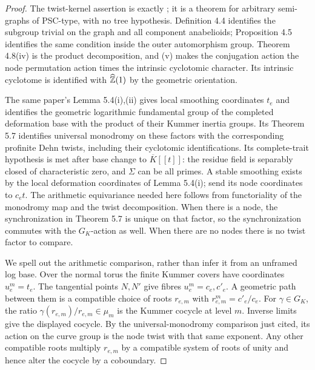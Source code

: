 \begin{proof}
The twist-kernel assertion is exactly \cite[Definition 4.4, Proposition 4.5, Theorem 4.8(iv),(v), and Proposition 4.10(ii), summarized as Theorem B]{HoshiMochizuki2012A567}; it is a theorem for arbitrary semi-graphs of PSC-type, with no tree hypothesis. Definition 4.4 identifies the subgroup trivial on the graph and all component anabelioids; Proposition 4.5 identifies the same condition inside the outer automorphism group. Theorem 4.8(iv) is the product decomposition, and (v) makes the conjugation action the node permutation action times the intrinsic cyclotomic character. Its intrinsic cyclotome is identified with $\widehat{{\mathbb{Z}}}(1)$ by the geometric orientation.

The same paper's Lemma 5.4(i),(ii) gives local smoothing coordinates $t_e$ and identifies the geometric logarithmic fundamental group of the completed deformation base with the product of their Kummer inertia groups. Its Theorem 5.7 identifies universal monodromy on these factors with the corresponding profinite Dehn twists, including their cyclotomic identifications. Its complete-trait hypothesis is met after base change to $\overline{K}[[t]]$: the residue field is separably closed of characteristic zero, and $\Sigma$ can be all primes. A stable smoothing exists by the local deformation coordinates of Lemma 5.4(i); send its node coordinates to $c_et$. The arithmetic equivariance needed here follows from functoriality of the monodromy map and the twist decomposition. When there is a node, the synchronization in Theorem 5.7 is unique on that factor, so the synchronization commutes with the $G_K$-action as well. When there are no nodes there is no twist factor to compare.

We spell out the arithmetic comparison, rather than infer it from an unframed log base. Over the normal torus the finite Kummer covers have coordinates $u_e^m=t_e$. The tangential points $N,N'$ give fibres $u_e^m=c_e,c'_e$. A geometric path between them is a compatible choice of roots $r_{e,m}$ with
$r_{e,m}^m=c'_e/c_e$. For $\gamma\in G_K$, the ratio
$\gamma(r_{e,m})/r_{e,m}\in\mu_m$ is the Kummer cocycle at level $m$. Inverse limits give the displayed cocycle. By the universal-monodromy comparison just cited, its action on the curve group is the node twist with that same exponent. Any other compatible roots multiply $r_{e,m}$ by a compatible system of roots of unity and hence alter the cocycle by a coboundary.


\end{proof}
